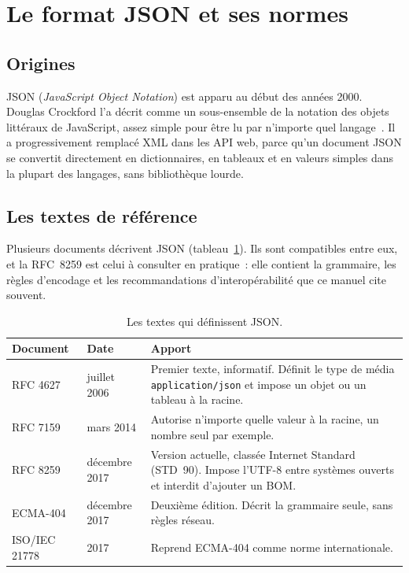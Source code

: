 \documentclass[12pt,a4paper]{article}
\begin{document}
\section{Le format JSON et ses normes}
\label{sec:normes}

\subsection{Origines}
JSON (\textit{JavaScript Object Notation}) est apparu au début des années 2000. Douglas Crockford l'a décrit comme un sous-ensemble de la notation des objets littéraux de JavaScript, assez simple pour être lu par n'importe quel langage~\cite{crockford2008js}. Il a progressivement remplacé XML dans les API web, parce qu'un document JSON se convertit directement en dictionnaires, en tableaux et en valeurs simples dans la plupart des langages, sans bibliothèque lourde.

\subsection{Les textes de référence}
Plusieurs documents décrivent JSON (tableau~\ref{tab:normes}). Ils sont compatibles entre eux, et la RFC~8259 est celui à consulter en pratique~: elle contient la grammaire, les règles d'encodage et les recommandations d'interopérabilité que ce manuel cite souvent.

\begin{table}[htbp]
\centering
\footnotesize
\begin{tabularx}{\textwidth}{llX}
\toprule
\textbf{Document} & \textbf{Date} & \textbf{Apport} \\
\midrule
RFC 4627~\cite{crockford2006rfc4627} & juillet 2006 & Premier texte, informatif. Définit le type de média \texttt{application/json} et impose un objet ou un tableau à la racine. \\
RFC 7159~\cite{bray2014rfc7159} & mars 2014 & Autorise n'importe quelle valeur à la racine, un nombre seul par exemple. \\
RFC 8259~\cite{bray2017rfc8259} & décembre 2017 & Version actuelle, classée Internet Standard (STD~90). Impose l'UTF-8 entre systèmes ouverts et interdit d'ajouter un BOM. \\
ECMA-404~\cite{ecma404} & décembre 2017 & Deuxième édition. Décrit la grammaire seule, sans règles réseau. \\
ISO/IEC 21778~\cite{iso21778} & 2017 & Reprend ECMA-404 comme norme internationale. \\
\bottomrule
\end{tabularx}
\caption{Les textes qui définissent JSON.}
\label{tab:normes}
\end{table}
\end{document}
